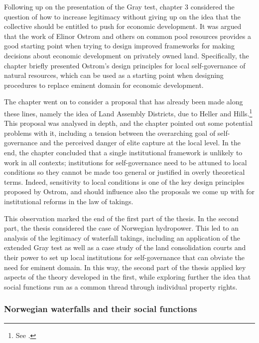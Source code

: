 Following up on the presentation of the Gray test, chapter 3 considered the question of how to increase legitimacy without giving up on the idea that the collective should be entitled to push for economic development. It was argued that the work of Elinor Ostrom and others on common pool resources provides a good starting point when trying to design improved frameworks for making decisions about economic development on privately owned land. Specifically, the chapter briefly presented Ostrom's design principles for local self-governance of natural resources, which can be used as a starting point when designing procedures to replace eminent domain for economic development.

The chapter went on to consider a proposal that has already been made along these lines, namely the idea of Land Assembly Districts, due to Heller and Hills.\footnote{See \cite{heller08}.} This proposal was analysed in depth, and the chapter pointed out some potential problems with it, including a tension between the overarching goal of self-governance and the perceived danger of elite capture at the local level. In the end, the chapter concluded that a single institutional framework is unlikely to work in all contexts; institutions for self-governance need to be attuned to local conditions so they cannot be made too general or justified in overly theoretical terms. Indeed, sensitivity to local conditions is one of the key design principles proposed by Ostrom, and should influence also the proposals we come up with for institutional reforms in the law of takings.

This observation marked the end of the first part of the thesis. In the second part, the thesis considered the case of Norwegian hydropower. This led to an analysis of the legitimacy of waterfall takings, including an application of the extended Gray test as well as a case study of the land consolidation courts and their power to set up local institutions for self-governance that can obviate the need for eminent domain. In this way, the second part of the thesis applied key aspects of the theory developed in the first, while exploring further the idea that social functions run as a common thread through individual property rights.

\subsubsection*{Norwegian waterfalls and their social functions}

